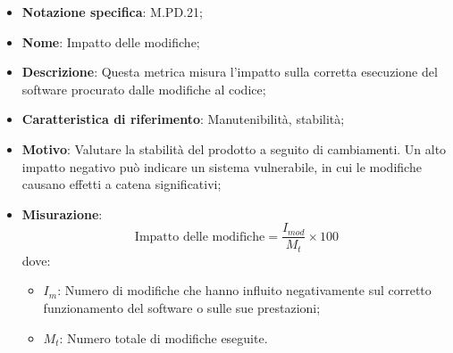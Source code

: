 \begin{itemize}
    \item \textbf{Notazione specifica}: M.PD.21;
    \item \textbf{Nome}: Impatto delle modifiche;
    \item \textbf{Descrizione}: Questa metrica misura l'impatto sulla corretta esecuzione del software procurato dalle modifiche al codice;
    \item \textbf{Caratteristica di riferimento}: Manutenibilità, stabilità;
    \item \textbf{Motivo}: Valutare la stabilità del prodotto a seguito di cambiamenti. Un alto impatto negativo può indicare un sistema vulnerabile, in cui le modifiche causano effetti a catena significativi;
    \item \textbf{Misurazione}: 
    \[
    \text{Impatto delle modifiche} = \frac{I_{mod}}{M_{t}} \times 100
    \]
    dove:
    \begin{itemize}
        \item $I_{m}$: Numero di modifiche che hanno influito negativamente sul corretto funzionamento del software o sulle sue prestazioni;
        \item $M_{t}$: Numero totale di modifiche eseguite.
    \end{itemize}
\end{itemize}
